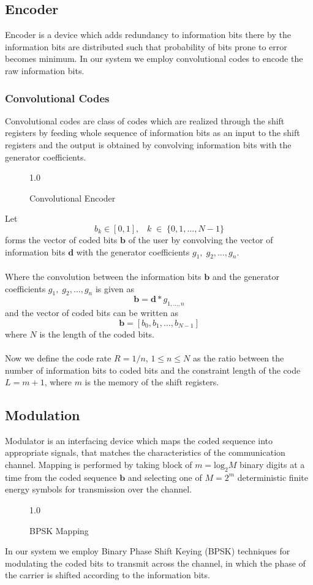 \subsection{Encoder}
Encoder is a device which adds redundancy to information bits there by the information bits are distributed such that probability of bits prone to error becomes minimum. In our system we employ convolutional codes to encode the raw information bits.
\subsubsection{Convolutional Codes}
Convolutional codes are class of codes which are realized through the shift registers by feeding whole sequence of information bits as an input to the shift registers and the output is obtained by convolving information bits with the generator coefficients. 
\begin{figure}[htb]
\centerline{  {1.0} }
\caption{Convolutional Encoder}
\end{figure}
Let
\begin{equation}
b_k\in[0,1],\;\;\;k\;\in\;\{0,1,\dots,N-1\}
\end{equation}
forms the vector of coded bits $\mathrm{\mathbf{b}}$ of the user by convolving the vector of information bits $\mathrm{\mathbf{d}}$ with the generator coefficients $g_1,\;g_2,\dots,g_n$. \\ \\
Where the convolution between the information bits $\mathrm{\mathbf{b}}$ and the generator coefficients $g_1,\;g_2,\dots,g_n$ is given as
\begin{equation}
\mathrm{\mathbf{b}}=\mathrm{\mathbf{d}}*g_{1,\dots,n}
\end{equation}
and the vector of coded bits can be written as
\begin{equation}
\mathrm{\mathbf{b}}=[b_0, b_1,\dots,b_{N-1}]
\end{equation}
where $N$ is the length of the coded bits.\\ \\
Now we define the code rate $R=1/n$, $1\leq n \leq N $ as the ratio between the number of information bits to coded bits and the constraint length of the code $L=m+1$, where $m$ is the memory of the shift registers.
\subsection{Modulation}
Modulator is an interfacing device which maps the coded sequence into appropriate signals, that matches the characteristics of the communication channel. Mapping is performed by taking block of $m=\mathrm{log_2}M$ binary digits at a time from the coded sequence $\mathrm{\mathbf{b}}$ and selecting one of $M=2^m$ deterministic finite energy symbols for transmission over the channel.
\begin{figure}[htb]
\centerline{  {1.0} }
\caption{BPSK Mapping}
\end{figure}
In our system we employ Binary Phase Shift Keying (BPSK) techniques for modulating the coded bits to transmit across the channel, in which the phase of the carrier is shifted according to the information bits.
